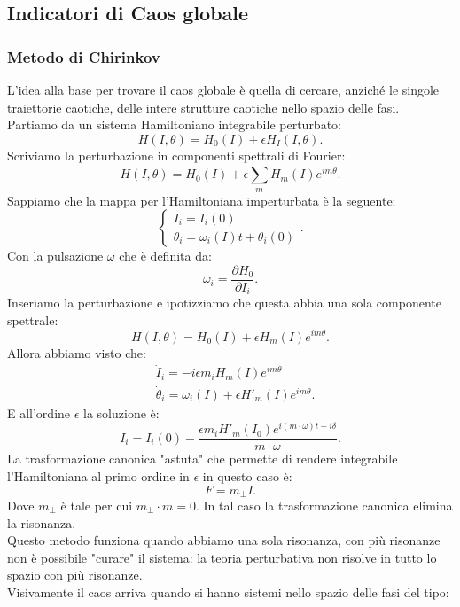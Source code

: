 \subsection{Indicatori di Caos globale}%
\label{sub:Indicatori di Caos globaliIndicatori di Caos globale: metodo di Chirinkov}
\subsubsection{Metodo di Chirinkov}%
\label{subsub:metodo di Chirinkov}
L'idea alla base per trovare il caos globale è quella di cercare, anziché le singole traiettorie caotiche, delle intere strutture caotiche nello spazio delle fasi.\\
Partiamo da un sistema Hamiltoniano integrabile perturbato:
\[
    H(I,\theta) = H_0(I) + \epsilon H_I(I, \theta)
.\] 
Scriviamo la perturbazione in componenti spettrali di Fourier:
\[
    H(I,\theta) = H_0(I) + \epsilon \sum_{m}^{} H_m(I)e^{im\theta}
.\] 
Sappiamo che la mappa per l'Hamiltoniana imperturbata è la seguente:
\[
    \begin{cases}
	I_i = I_i(0)\\
	\theta_i = \omega_i(I)t + \theta_i(0)
    \end{cases}
.\] 
Con la pulsazione $\omega$ che è definita da:
\[
    \omega_i = \frac{\partial H_0}{\partial I_i} 
.\] 
Inseriamo la perturbazione e ipotizziamo che questa abbia una sola componente spettrale:
\[
    H(I,\theta) = H_0(I) + \epsilon H_m(I)e^{im\theta}
.\] 
Allora abbiamo visto che:
\[\begin{aligned}
    &\dot{I}_i = -i \epsilon  m_i H_m(I)e^{im\theta}\\
    &\dot{\theta}_i = \omega_i(I) + \epsilon  H'_m(I)e^{im\theta}
.\end{aligned}\]
E all'ordine $\epsilon$  la soluzione è:
\[
    I_i = I_i(0)-\frac{\epsilon m_i H'_m(I_0)e^{i(m\cdot \omega)t + i\delta}}{m\cdot \omega}
.\] 
La trasformazione canonica "astuta" che permette di rendere integrabile l'Hamiltoniana al primo ordine in $\epsilon$ in questo caso è:
\[
    F = m_{\perp}I
.\] 
Dove $m_{\perp}$ è tale per cui $m_{\perp}\cdot m = 0$. In tal caso la trasformazione canonica elimina la risonanza.\\
Questo metodo funziona quando abbiamo una sola risonanza, con più risonanze non è possibile "curare" il sistema: la teoria perturbativa non risolve in tutto lo spazio con più risonanze.\\
Visivamente il caos arriva quando si hanno sistemi nello spazio delle fasi del tipo:
